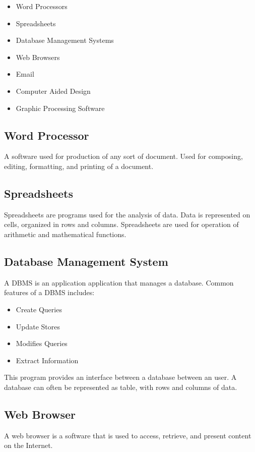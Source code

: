 \documentclass[../notes.tex]{subfiles}
\begin{document}
\begin{itemize}
	\item Word Processors
	\item Spreadsheets
	\item Database Management Systems
	\item Web Browsers
	\item Email
	\item Computer Aided Design
	\item Graphic Processing Software
\end{itemize}

\subsection{Word Processor}
A software used for production of any sort of document.
Used for composing, editing, formatting, and printing of a document.

\subsection{Spreadsheets}
Spreadsheets are programs used for the analysis of data.
Data is represented on cells, organized in rows and columns.
Spreadsheets are used for operation of arithmetic and mathematical functions.

\subsection{Database Management System}
A DBMS is an application application that manages a database.
Common features of a DBMS includes:
\begin{itemize}
	\item Create Queries
	\item Update Stores
	\item Modifies Queries
	\item Extract Information
\end{itemize}

This program provides an interface between a database between an user.
A database can often be represented as table, with rows and columns of data.

\subsection{Web Browser}
A web browser is a software that is used to access, retrieve, and present content on the Internet.
\end{document}
